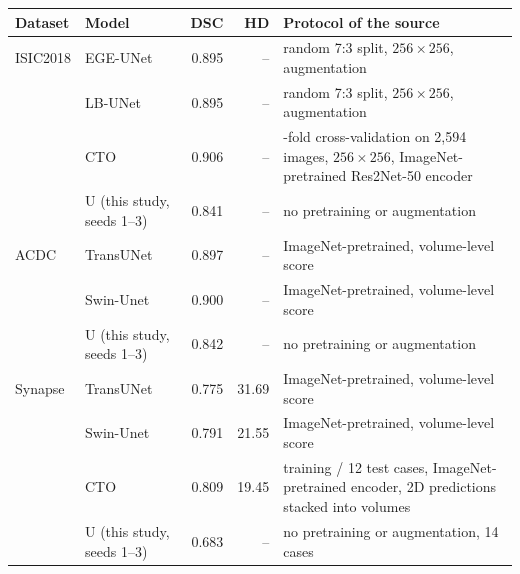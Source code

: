 \begin{tabular}{@{}llrr>{\raggedright\arraybackslash}p{5.6cm}@{}}
\toprule
Dataset & Model & DSC & HD\tnote{a} & Protocol of the source \\
\midrule
ISIC2018 & EGE-UNet \citep{Ruan2023EGEUNet} & 0.895 & -- & random 7:3 split, $256\times256$, augmentation \\
 & LB-UNet \citep{Xu2024LBUNet} & 0.895 & -- & random 7:3 split, $256\times256$, augmentation \\
 & CTO \citep{Lin2025Rethinking} & 0.906 & -- & 5-fold cross-validation on 2,594 images, $256\times256$, ImageNet-pretrained Res2Net-50 encoder \\
 & U (this study, seeds 1--3)\tnote{b} & 0.841 & -- & no pretraining or augmentation \\
\addlinespace
ACDC & TransUNet \citep{Chen2021TransUNetArxiv} & 0.897 & -- & ImageNet-pretrained, volume-level score \\
 & Swin-Unet \citep{Cao2022SwinUnet} & 0.900 & -- & ImageNet-pretrained, volume-level score \\
 & U (this study, seeds 1--3)\tnote{c} & 0.842 & -- & no pretraining or augmentation \\
\addlinespace
Synapse & TransUNet \citep{Chen2021TransUNetArxiv} & 0.775 & 31.69 & ImageNet-pretrained, volume-level score \\
 & Swin-Unet \citep{Cao2022SwinUnet} & 0.791 & 21.55 & ImageNet-pretrained, volume-level score \\
 & CTO \citep{Lin2025Rethinking} & 0.809 & 19.45 & 18 training / 12 test cases, ImageNet-pretrained encoder, 2D predictions stacked into volumes \\
 & U (this study, seeds 1--3)\tnote{c} & 0.683 & -- & no pretraining or augmentation, 14 cases \\
\bottomrule
\end{tabular}
